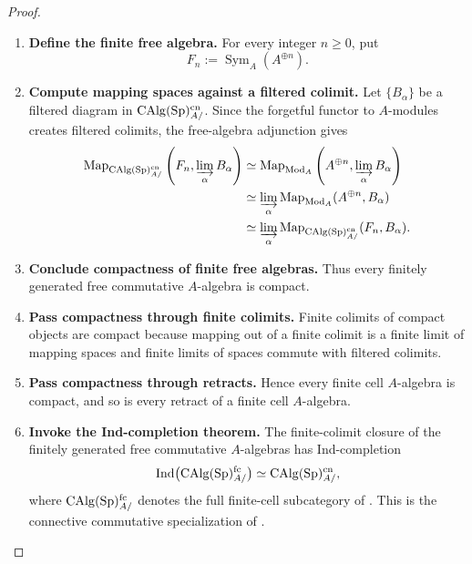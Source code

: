 \begin{proof}
\leavevmode
\begin{enumerate}[label=\textup{(\arabic*)}]
    \item \textbf{Define the finite free algebra.}
    For every integer \(n\geq0\), put
    \[
        F_n:=\operatorname{Sym}_A(A^{\oplus n}).
    \]

    \item \textbf{Compute mapping spaces against a filtered colimit.}
    Let \(\{B_\alpha\}\) be a filtered diagram in
    \(\operatorname{CAlg}(\operatorname{Sp})^{\mathrm{cn}}_{A/}\). Since the forgetful functor to
    \(A\)-modules creates filtered colimits, the free-algebra adjunction gives
    \[
    \begin{aligned}
        \operatorname{Map}_{\operatorname{CAlg}(\operatorname{Sp})^{\mathrm{cn}}_{A/}}
        \left(F_n,\varinjlim_\alpha B_\alpha\right)
        &\simeq
        \operatorname{Map}_{\operatorname{Mod}_A}
        \left(A^{\oplus n},\varinjlim_\alpha B_\alpha\right)
        \\
        &\simeq
        \varinjlim_\alpha
        \operatorname{Map}_{\operatorname{Mod}_A}(A^{\oplus n},B_\alpha)
        \\
        &\simeq
        \varinjlim_\alpha
        \operatorname{Map}_{\operatorname{CAlg}(\operatorname{Sp})^{\mathrm{cn}}_{A/}}(F_n,B_\alpha).
    \end{aligned}
    \]

    \item \textbf{Conclude compactness of finite free algebras.}
    Thus every finitely generated free commutative \(A\)-algebra is compact.

    \item \textbf{Pass compactness through finite colimits.}
    Finite colimits of compact objects are compact because mapping out of a
    finite colimit is a finite limit of mapping spaces and finite limits of
    spaces commute with filtered colimits.

    \item \textbf{Pass compactness through retracts.}
    Hence every finite cell
    \(A\)-algebra is compact, and so is every retract of a finite cell
    \(A\)-algebra.

    \item \textbf{Invoke the Ind-completion theorem.}
    The finite-colimit closure of the finitely generated free commutative
    \(A\)-algebras has Ind-completion
    \[
        \operatorname{Ind}
        \bigl(\operatorname{CAlg}(\operatorname{Sp})^{\mathrm{fc}}_{A/}\bigr)
        \simeq
        \operatorname{CAlg}(\operatorname{Sp})^{\mathrm{cn}}_{A/},
    \]
    where \(\operatorname{CAlg}(\operatorname{Sp})^{\mathrm{fc}}_{A/}\) denotes the full finite-cell
    subcategory of . This is the
    connective commutative specialization of
    \cite[Definition~7.2.4.26 and Proposition~7.2.4.27]{LurieHigherAlgebra}.


\end{enumerate}
\end{proof}
